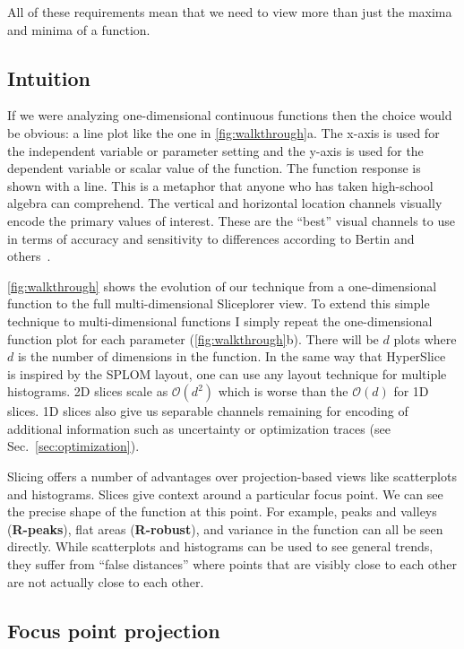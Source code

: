 All of
these requirements mean that we need to view more than just the maxima and
minima of a function.

\subsection{Intuition}

If we were analyzing one-dimensional continuous functions then the choice would
be obvious: a line plot like the one in \autoref{fig:walkthrough}a. The x-axis
is used for the independent variable or parameter setting and the y-axis is
used for the dependent variable or scalar value of the function. The function
response is shown with a line. This is a metaphor that anyone who has taken
high-school algebra can comprehend. The vertical and horizontal location
channels visually encode the primary values of interest. These are the ``best''
visual channels to use in terms of accuracy and sensitivity to differences
according to Bertin and others~\cite{Bertin:1967, Mackinlay:1986}. 

\autoref{fig:walkthrough} shows the evolution
of our technique from a one-dimensional function to the full multi-dimensional
Sliceplorer view.
To extend this simple technique to multi-dimensional functions I simply repeat
the one-dimensional function plot for each parameter
(\autoref{fig:walkthrough}b). 
There will be \(d\) plots where \(d\) is
the number of dimensions in the function. In the same way that
HyperSlice~\cite{Wijk:1993} is inspired by the SPLOM layout, one can use any
layout technique for multiple histograms. 2D slices scale as $\mathcal{O}(d^2)$
which is worse than the $\mathcal{O}(d)$ for 1D slices. 
1D slices also give us separable channels remaining for encoding of additional
information such as uncertainty or optimization traces (see
Sec.~\ref{sec:optimization}).

Slicing offers a number of advantages over projection-based views like
scatterplots and histograms. Slices give context around a particular focus
point. We can see the precise shape of the function at this point.  For
example, peaks and valleys (\textbf{R-peaks}), flat areas (\textbf{R-robust}),
and variance in the function can all be seen directly.  While scatterplots and
histograms can be used to see general trends, they suffer from ``false
distances'' where points that are visibly close to each other are not actually
close to each other. 

\subsection{Focus point projection}

